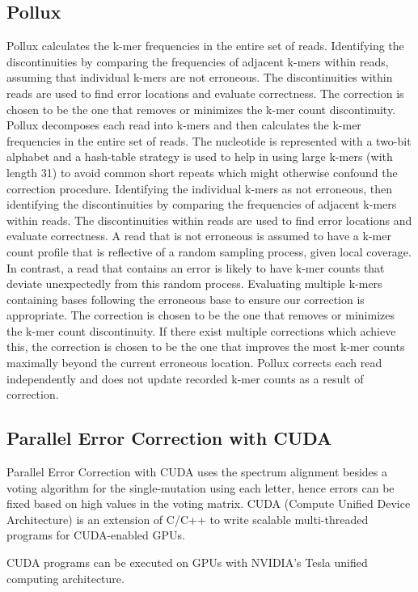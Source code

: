 \documentclass{llncs}
\begin{document}
\subsection{Pollux}
Pollux \cite{Pollux} calculates the k-mer frequencies in the entire set of reads. Identifying the discontinuities by comparing the frequencies of adjacent k-mers within reads, assuming that individual k-mers are not erroneous. The discontinuities within reads are used to find error locations and evaluate correctness. The correction is chosen to be the one that removes or minimizes the k-mer count discontinuity.
Pollux decomposes each read into k-mers and then calculates the k-mer frequencies in the entire set of reads. The nucleotide is represented with a two-bit alphabet and a hash-table strategy is used to help in using large k-mers (with length 31) to avoid common short repeats which might otherwise confound the correction procedure.
Identifying the individual k-mers as not erroneous, then identifying the discontinuities by comparing the frequencies of adjacent k-mers within reads. The discontinuities within reads are used to find error locations and evaluate correctness. A read that is not erroneous is assumed to have a k-mer count profile that is reflective of a random sampling process, given local coverage. In contrast, a read that contains an error is likely to have k-mer counts that deviate unexpectedly from this random process. Evaluating multiple k-mers containing bases following the erroneous base to ensure our correction is appropriate. The correction is chosen to be the one that removes or minimizes the k-mer count discontinuity. If there exist multiple corrections which achieve this, the correction is chosen to be the one that improves the most k-mer counts maximally beyond the current erroneous location. Pollux corrects each read independently and does not update recorded k-mer counts as a result of correction.


\subsection{Parallel Error Correction with CUDA}
Parallel Error Correction with CUDA \cite{Cuda} uses the spectrum alignment besides a voting algorithm for the single-mutation using each letter, hence errors can be fixed based on high values in the voting matrix.
CUDA (Compute Unified Device Architecture) is an extension of C/C++ to write scalable multi-threaded programs for CUDA-enabled GPUs.

CUDA programs can be executed on GPUs with NVIDIA’s Tesla unified computing architecture.
\end{document}
